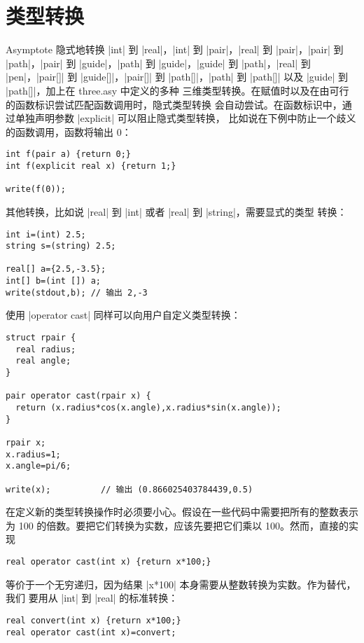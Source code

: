 \documentclass{ctexbook}
\newcommand*\prgname[1]{\textsf{#1}}
\begin{document}
{{{\section{类型转换}
\label{sec:casts}

\prgname{Asymptote} 隐式地转换 |int| 到 |real|，|int| 到 |pair|，|real| 到
|pair|，|pair| 到 |path|，|pair| 到 |guide|，|path| 到 |guide|，|guide| 到
|path|，|real| 到 |pen|，|pair[]| 到 |guide[]|，|pair[]| 到 |path[]|，|path|
到 |path[]| 以及 |guide| 到 |path[]|，加上在 \prgname{three.asy} 中定义的多种
三维类型转换。在赋值时以及在由可行的函数标识尝试匹配函数调用时，隐式类型转换
会自动尝试。在函数标识中，通过单独声明参数 |explicit| 可以阻止隐式类型转换，
比如说在下例中防止一个歧义的函数调用，函数将输出 0：
\begin{lstlisting}
int f(pair a) {return 0;}
int f(explicit real x) {return 1;}

write(f(0));
\end{lstlisting}

其他转换，比如说 |real| 到 |int| 或者 |real| 到 |string|，需要显式的类型
转换：
\begin{lstlisting}
int i=(int) 2.5;
string s=(string) 2.5;

real[] a={2.5,-3.5};
int[] b=(int []) a;
write(stdout,b); // 输出 2,-3  
\end{lstlisting}

使用 |operator cast| 同样可以向用户自定义类型转换：
\begin{lstlisting}
struct rpair {
  real radius;
  real angle;
}

pair operator cast(rpair x) {
  return (x.radius*cos(x.angle),x.radius*sin(x.angle));
}

rpair x;
x.radius=1;
x.angle=pi/6;

write(x);          // 输出 (0.866025403784439,0.5)
\end{lstlisting}

在定义新的类型转换操作时必须要小心。假设在一些代码中需要把所有的整数表示为
100 的倍数。要把它们转换为实数，应该先要把它们乘以 100。然而，直接的实现
\begin{lstlisting}
real operator cast(int x) {return x*100;}
\end{lstlisting}
等价于一个无穷递归，因为结果 |x*100| 本身需要从整数转换为实数。作为替代，我们
要用从 |int| 到 |real| 的标准转换：
\begin{lstlisting}
real convert(int x) {return x*100;}
real operator cast(int x)=convert;
\end{lstlisting}

}}}
\end{document}
